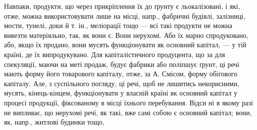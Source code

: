 Навпаки, продукти, що через прикріплення їх до ґрунту є льокалізовані,
і які, отже, можна використовувати лише на місці, напр., фабричні
будівлі, залізниці, мости, тунелі, доки й т. ін., меліорації тощо —
всі такі продукти не можна вивезти матеріяльно, так, як вони є. Вони
нерухомі. Або їх марно спродуковано, або, якщо їх продано, вони мусять
функціонувати як основний капітал, — у тій країні, де їх випродукувано.
Для капіталістичного продуцента, що за для спекуляції, маючи
на меті продаж, будує фабрики або поліпшує ґрунт, ці речі мають форму
його товарового капіталу, отже, за А. Смісом, форму обігового капіталу.
Але, з суспільного погляду, ці речі, щоб не лишитись некорисними,
мусять, кінець-кінцем, функціонувати у власній країні як основний
капітал у процесі продукції, фіксованому в місці їхнього перебування. Відси
ні в якому разі не випливає, що нерухомі речі, як такі, вже самі
собою є основний капітал; вони, як, напр., житлові будинки тощо,
\parbreak{}  %
